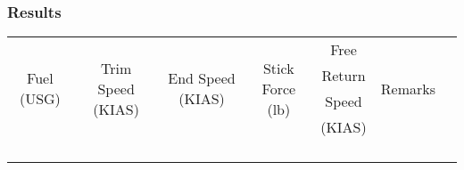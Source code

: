 % 
% 
%
\Large
\subsubsection*{Results}
  \settowidth{\colOne}{(USG)}
  \settowidth{\colTwo}{(KIAS)}
  \settowidth{\colFour}{Force}
  \settowidth{\colFive}{Remarks}

  \begin{tabularx}{\textwidth}{|c|c|c|c|c|lX|}
  \hline
   \multirow{4}{\colOne}{\centering Fuel (USG)}&\multirow{4}{\colTwo}{\centering Trim Speed (KIAS)}&\multirow{4}{\colTwo}{\centering End Speed (KIAS)}&\multirow{4}{\colFour}{\centering Stick Force (lb)}&Free&\multirow{4}{\colFive}{\centering Remarks}&\\
   &&&&Return&&\\
   &&&&Speed&&\\
   &&&&(KIAS)&&\\
   \hline
   \hline
   &&&&&&\\
   \hline
   &&&&&&\\
   \hline
   &&&&&&\\
   \hline
   &&&&&&\\
   \hline
   \end{tabularx}
  
   \normalsize
  
  
